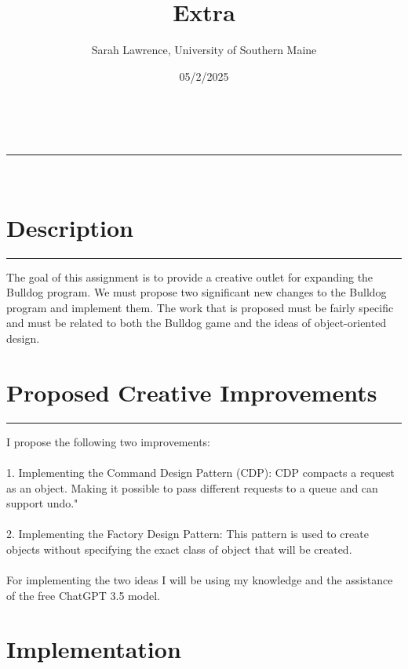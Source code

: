 \documentclass[a4paper,11pt]{article}
\makeatletter
\newcommand{\linia}{\rule{\linewidth}{0.5pt}}
\renewcommand{\maketitle}{
\begin{center}
\vspace{2ex}
{\huge \textsc{\@title}}
\vspace{1ex}
\\
\linia\\
\@author \hfill \@date
\vspace{4ex}
\end{center}
}
\makeatother
\begin{document}
\title{Extra}

\author{Sarah Lawrence, University of Southern Maine}

\date{05/2/2025}

\maketitle

\section*{Description}
\hrule
\vspace{13pt} %
The goal of this assignment is to provide a creative outlet for expanding the Bulldog program. We must propose two significant new changes to the Bulldog program and implement them. The work that is proposed must be fairly specific and must be related to both the Bulldog game and the ideas of object-oriented design. 

\section{Proposed Creative Improvements}
\hrule
\vspace{10pt} %
I propose the following two improvements: \\\\
1. Implementing the Command Design Pattern (CDP): CDP compacts a request as an object. Making it possible to pass different requests to a queue and can support undo."
\\\\
2. Implementing the Factory Design Pattern: This pattern is used to create objects without specifying the exact class of object that will be created.\\\\
For implementing the two ideas I will be using my knowledge and the assistance of the free ChatGPT 3.5 model. 

\section{Implementation}
\end{document}
